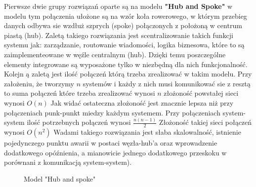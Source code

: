 Pierwsze dwie grupy rozwiązań oparte są na modelu \textbf{"Hub and Spoke"}  w modelu tym połączenia ułożone są na wzór koła rowerowego, w którym przebieg danych odbywa sie wzdłuż szprych (spoke) połączonych z położoną w centrum piastą (hub). Zaletą takiego rozwiązania jest scentralizowanie takich funkcji systemu jak: zarządzanie, routowanie wiadomości, logika biznesowa, które to są zaimplementeowane w węźle centralnym (hub). Dzięki temu poszczególne elementy integrowane są wyposażone tylko w niezbędną dla nich funkcjonalność. Kolejn	ą zaletą jest ilość połączeń którą trzeba zrealizować w takim modelu. Przy założeniu, że tworzymy \begin{math}n\end{math}  systemów i każdy z nich musi komunikować sie z resztą to suma połączeń które trzeba zrealizować wynosi  \begin{math}n\end{math}  złożoność powstałej sieci wynosi  \begin{math}O(n)\end{math}  Jak widać ostateczna złożoność jest znacznie lepsza niż przy połączeniach punk-punkt miedzy każdym systemem. Przy połączeniach system-system  ilość potrzebnych połączeń wynosi   \begin{math}\frac{n (n- 1)}{2}\end{math}  Złożoność takiej sieci połączeń wynosi  \begin{math}O(n^2)\end{math}  Wadami takiego rozwiązania jest słaba skalowalność, istnienie pojedynczego punktu awarii w postaci węzła-hub'a oraz wprowadzenie dodatkowego opóźnienia, a mianowicie jednego dodatkowego przeskoku w porównani z komunikacją system-system).

\setlength\fboxsep{20pt}
\setlength\fboxrule{1pt}
\begin{figure}[!h]
	\centering
	\caption{Model "Hub and spoke"}\label{fig:hub_and_spoke}
\end{figure}

